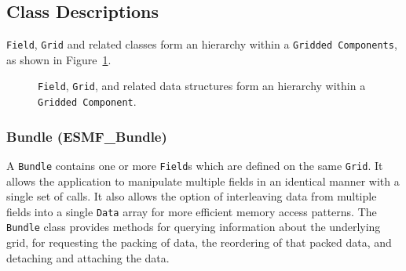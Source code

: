 \subsection{Class Descriptions}

{\tt Field}, {\tt Grid} and related classes form an hierarchy within 
a {\tt Gridded Components}, as shown in Figure~\ref{fig:datastruct}.

\begin{figure}
\caption[{Hierarchy of Data Structures}]{{\tt Field}, {\tt Grid}, and 
related data structures form an hierarchy within a {\tt Gridded Component}.}
\label{fig:datastruct}
\end{figure}


\subsubsection{Bundle (ESMF\_Bundle)}
\label{sec:bundle} 
A {\tt Bundle} contains one or more {\tt Field}s which are defined on 
the same {\tt Grid}.  It allows the application to manipulate multiple fields in 
an identical manner with a single set of calls.  It also allows the option 
of interleaving data from multiple fields into a single {\tt Data} array for 
more efficient memory access patterns.  The {\tt Bundle} class provides methods 
for querying information about the underlying grid, for requesting the 
packing of data, the reordering of that packed data, and detaching and 
attaching the data.

